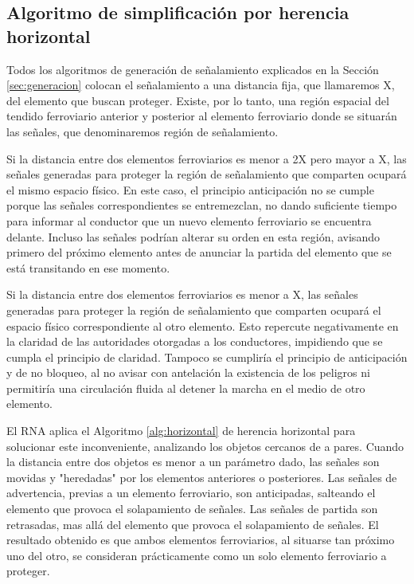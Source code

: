     \subsection{Algoritmo de simplificación por herencia horizontal}


Todos los algoritmos de generación de señalamiento explicados en la Sección \ref{sec:generacion} colocan el señalamiento a una distancia fija, que llamaremos X, del elemento que buscan proteger. Existe, por lo tanto, una región espacial del tendido ferroviario anterior y posterior al elemento ferroviario donde se situarán las señales, que denominaremos región de señalamiento. 

Si la distancia entre dos elementos ferroviarios es menor a 2X pero mayor a X, las señales generadas para proteger la región de señalamiento que comparten ocupará el mismo espacio físico. En este caso, el principio anticipación no se cumple porque las señales correspondientes se entremezclan, no dando suficiente tiempo para informar al conductor que un nuevo elemento ferroviario se encuentra delante. Incluso las señales podrían alterar su orden en esta región, avisando primero del próximo elemento antes de anunciar la partida del elemento que se está transitando en ese momento.

Si la distancia entre dos elementos ferroviarios es menor a X, las señales generadas para proteger la región de señalamiento que comparten ocupará el espacio físico correspondiente al otro elemento. Esto repercute negativamente en la claridad de las autoridades otorgadas a los conductores, impidiendo que se cumpla el principio de claridad. Tampoco se cumpliría el principio de anticipación y de no bloqueo, al no avisar con antelación la existencia de los peligros ni permitiría una circulación fluida al detener la marcha en el medio de otro elemento.

El RNA aplica el Algoritmo \ref{alg:horizontal} de herencia horizontal para solucionar este inconveniente, analizando los objetos cercanos de a pares. Cuando la distancia entre dos objetos es menor a un parámetro dado, las señales son movidas y "heredadas" por los elementos anteriores o posteriores. Las señales de advertencia, previas a un elemento ferroviario, son anticipadas, salteando el elemento que provoca el solapamiento de señales. Las señales de partida son retrasadas, mas allá del elemento que provoca el solapamiento de señales. El resultado obtenido es que ambos elementos ferroviarios, al situarse tan próximo uno del otro, se consideran prácticamente como un solo elemento ferroviario a proteger.

